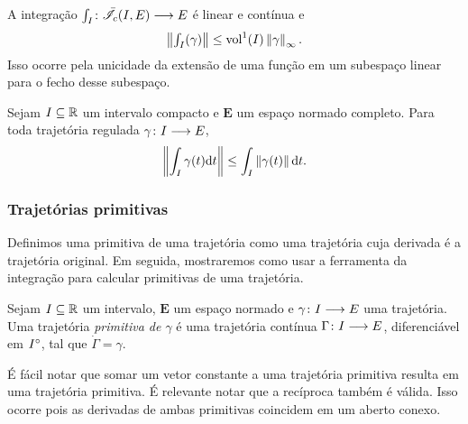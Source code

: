 A integração $\int_I\colon \allowbreak \bar{\mathscr{I}}_{c}(I,E) \longrightarrow E$ é linear e contínua e
	\begin{equation*}
	\left\Vert{\textstyle\int_I(\gamma)}\right\Vert \leq \operatorname{vol}^1(I) \left\Vert{\gamma}\right\Vert_{\infty}.
	\end{equation*}
Isso ocorre pela unicidade da extensão de uma função em um subespaço linear para o fecho desse subespaço.

\begin{exercise}
Sejam $I \subseteq \mathbb{R}$ um intervalo compacto e $\bm E$ um espaço normado completo. Para toda trajetória regulada $\gamma\colon \allowbreak I \longrightarrow E$,
	\begin{equation*}
	\left\Vert{\int_I \gamma(t) \mathrm{d}t}\right\Vert \leq \int_I \left\Vert{\gamma(t)}\right\Vert \mathrm{d} t.
	\end{equation*}
\end{exercise}

\subsubsection{Trajetórias primitivas}

Definimos uma primitiva de uma trajetória como uma trajetória cuja derivada é a trajetória original. Em seguida, mostraremos como usar a ferramenta da integração para calcular primitivas de uma trajetória.

\begin{definition}
Sejam $I \subseteq \mathbb{R}$ um intervalo, $\bm E$ um espaço normado e $\gamma\colon \allowbreak I \longrightarrow E$ uma trajetória. Uma trajetória \emph{primitiva de $\gamma$} é uma trajetória contínua $\Gamma\colon \allowbreak I \longrightarrow E$, diferenciável em ${I}^\circ$, tal que $\dot \Gamma = \gamma$.
\end{definition}

É fácil notar que somar um vetor constante a uma trajetória primitiva resulta em uma trajetória primitiva. É relevante notar que a recíproca também é válida. Isso ocorre pois as derivadas de ambas primitivas coincidem em um aberto conexo.

